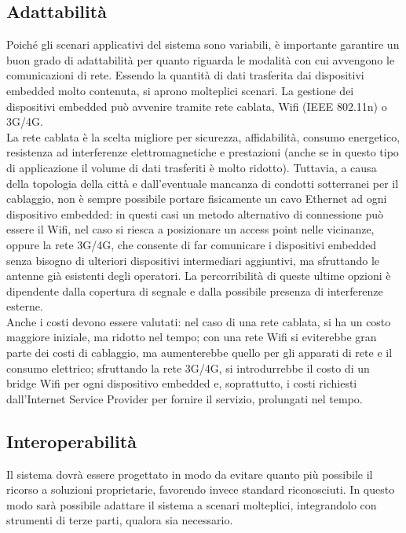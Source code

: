 \subsection{Adattabilità}
Poiché gli scenari applicativi del sistema sono variabili, è importante garantire un buon grado di adattabilità per quanto riguarda le modalità con cui avvengono le comunicazioni di rete.
Essendo la quantità di dati trasferita dai dispositivi embedded molto contenuta, si aprono molteplici scenari.
La gestione dei dispositivi embedded può avvenire tramite rete cablata, Wifi (IEEE 802.11n) o 3G/4G.
\\La rete cablata è la scelta migliore per sicurezza, affidabilità, consumo energetico, resistenza ad interferenze elettromagnetiche e prestazioni (anche se in questo tipo di applicazione il volume di dati trasferiti è molto ridotto).
Tuttavia, a causa della topologia della città e dall’eventuale mancanza di condotti sotterranei per il cablaggio, non è sempre possibile portare fisicamente un cavo Ethernet ad ogni dispositivo embedded: in questi casi un metodo alternativo di connessione può essere il Wifi, nel caso si riesca a posizionare un access point nelle vicinanze, oppure la rete 3G/4G, che consente di far comunicare i dispositivi embedded senza bisogno di ulteriori dispositivi intermediari aggiuntivi, ma sfruttando le antenne già esistenti degli operatori.
La percorribilità di queste ultime opzioni è dipendente dalla copertura di segnale e dalla possibile presenza di interferenze esterne.
\\Anche i costi devono essere valutati: nel caso di una rete cablata, si ha un costo maggiore iniziale, ma ridotto nel tempo; con una rete Wifi si eviterebbe gran parte dei costi di cablaggio, ma aumenterebbe quello per gli apparati di rete e il consumo elettrico; sfruttando la rete 3G/4G, si introdurrebbe il costo di un bridge Wifi per ogni dispositivo embedded e, soprattutto, i costi richiesti dall'Internet Service Provider per fornire il servizio, prolungati nel tempo.

\subsection{Interoperabilità}
Il sistema dovrà essere progettato in modo da evitare quanto più possibile il ricorso a soluzioni proprietarie, favorendo invece standard riconosciuti.
In questo modo sarà possibile adattare il sistema a scenari molteplici, integrandolo con strumenti di terze parti, qualora sia necessario.
